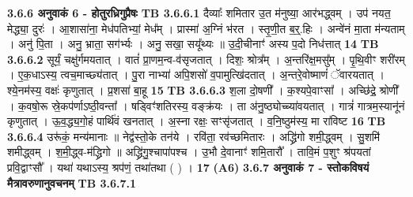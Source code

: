 \documentclass[17pt]{extarticle}
\begin{document}
{{{{{{{{{{{{{{{{{{{                \textbf{ 3.6.6     अनुवाकं   6 - होतुरध्रिगुप्रैषः} \newline
                                \textbf{ TB 3.6.6.1} \newline
                  दैव्याः᳚ शमितार उ॒त म॑नुष्या॒ आर॑भद्ध्वम् । उप॑ नयत॒ मेद्ध्या॒ दुरः॑ । आ॒शासा॑ना॒ मेध॑पतिभ्यां॒ मेध᳚म् । प्रास्मा॑ अ॒ग्निं भ॑रत । स्तृ॒णी॒त ब॒र्॒.हिः । अन्वे॑नं मा॒ता म॑न्यताम् । अनु॑ पि॒ता । अनु॒ भ्राता॒ सग॑र्भ्यः । अनु॒ सखा॒ सयू᳚थ्यः ॥ उ॒दी॒चीनाꣳ॑ अस्य प॒दो निध॑त्तात् \textbf{ 14} \newline
                  \newline
                                \textbf{ TB 3.6.6.2} \newline
                  सूर्यं॒ चक्षु॑र्गमयतात् । वातं॑ प्रा॒णम॒न्व-व॑सृजतात् । दिशः॒ श्रोत्र᳚म् । अ॒न्तरि॑क्ष॒मसु᳚म् । पृ॒थि॒वीꣳ शरी॑रम् । ए॒क॒धाऽस्य॒ त्वच॒माच्छ्य॑तात् । पु॒रा नाभ्या॑ अपि॒शसो॑ व॒पामुत्खि॑दतात् । अ॒न्तरे॒वोष्माणं॑ ॅवारयतात् । श्ये॒नम॑स्य॒ वक्षः॑ कृणुतात् । प्र॒शसा॑ बा॒हू \textbf{ 15} \newline
                  \newline
                                \textbf{ TB 3.6.6.3} \newline
                  श॒ला दो॒षणी᳚ । क॒श्यपे॒वाꣳसा᳚ । अच्छि॑द्रे॒ श्रोणी᳚ । क॒वषो॒रू स्रे॒कप॑र्णाऽष्ठी॒वन्ता᳚ । षड्विꣳ॑शतिरस्य॒ वङ्क्र॑यः । ता अ॑नु॒ष्ठ्योच्च्या॑वयतात् । गात्रं॑ गात्रम॒स्यानू॑नं कृणुतात् । ऊ॒व॒द्ध्य॒गो॒हं पार्थि॑वं खनतात् । अ॒स्ना रक्षः॒ सꣳसृ॑जतात् । व॒नि॒ष्ठुम॑स्य॒ मा रा॑विष्ट \textbf{ 16} \newline
                  \newline
                                \textbf{ TB 3.6.6.4} \newline
                  उरू॑कं॒ मन्य॑मानाः ॥ नेद्व॑स्तो॒के तन॑ये । रवि॑ता॒ रव॑च्छमितारः । अद्ध्रि॑गो शमी॒द्ध्वम् । सु॒शमि॑ शमीद्ध्वम् । श॒मी॒द्ध्व-म॑द्ध्रिगो ॥ अद्ध्रि॑गु॒श्चापा॑पश्च । उ॒भौ दे॒वानाꣳ॑ शमि॒तारौ᳚ । तावि॒मं प॒शुꣳ श्र॑पयतां प्रवि॒द्वाꣳसौ᳚ । यथा॑ यथाऽस्य॒ श्रप॑णं॒ तथा॑तथा ( ) । \textbf{ 17} \newline
                  \newline
                                    [ध॒त्ता॒द् - बा॒हू - मा रा॑विष्ट॒ - तथा॑तथा ( ) ] \textbf{(A6)} \newline \newline
                \textbf{ 3.6.7     अनुवाकं   7 - स्तोकविषयं मैत्रावरुणानुवचनम्} \newline
                                \textbf{ TB 3.6.7.1} \newline
}}}}}}}}}}}}}}}}}}}
\end{document}
